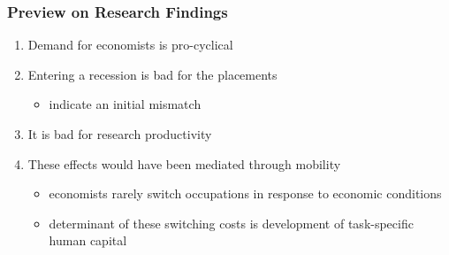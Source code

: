 \documentclass[10pt,svgnames,fragile]{beamer}
\begin{document}
\begin{frame}
	\frametitle{Preview on Research Findings}
	\begin{enumerate}
		\item Demand for economists is pro-cyclical
\vfill
		\item Entering a recession is bad for the placements
		\begin{itemize}
\vspace{1 mm}
		\item indicate an initial mismatch
		\end{itemize}
\vfill
				\item It is bad for research productivity
\vfill
		\item These effects would have been  mediated through mobility			
		\begin{itemize}
			\vspace{1 mm}
			\item economists rarely switch occupations in response to  economic conditions
			\vspace{1 mm}
			\item determinant of these switching costs is development of task-specific human capital
\vfill
		\end{itemize}
	\end{enumerate}
\end{frame}
\end{document}

